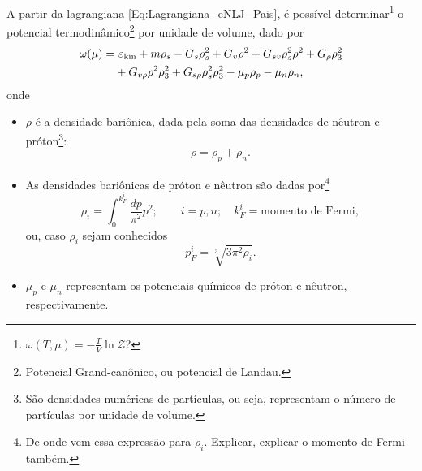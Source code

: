 A partir da lagrangiana \eqref{Eq:Lagrangiana_eNLJ_Pais}, é possível determinar\footnote{$\omega(T,\mu) = -\frac{T}{V} \ln \mathcal{Z}$?} o potencial termodinâmico\footnote{Potencial Grand-canônico, ou potencial de Landau.} por unidade de volume, dado por
\begin{equation}\label{Eq:potencial_termodinamico}
\begin{split}
	\omega(\mu) =&~ \varepsilon_{\rm{kin}} + m\rho_s - G_s\rho_s^2 + G_v\rho^2 + G_{sv}\rho_s^2\rho^2 + G_\rho\rho_3^2 \\
	&+ G_{v\rho}\rho^2\rho_3^2 + G_{s\rho}\rho_s^2\rho_3^2 - \mu_p\rho_p - \mu_n\rho_n,
\end{split}
\end{equation}
%
onde
\begin{itemize}
	\item $\rho$ é a densidade bariônica, dada pela soma das densidades de nêutron e próton\footnote{São densidades numéricas de partículas, ou seja, representam o número de partículas por unidade de volume.}:
	\begin{equation}
		\rho = \rho_p + \rho_n.
	\end{equation}

	\item As densidades bariônicas de próton e nêutron são dadas por\footnote{De onde vem essa expressão para $\rho_i$. Explicar, explicar o momento de Fermi também.}
	\begin{equation}
		\rho_i = \int_0^{k_F^i}\frac{dp}{\pi^2}p^2; \qquad i = p,n; \quad k_F^i = \textrm{momento de Fermi},
	\end{equation}
	ou, caso $\rho_i$ sejam conhecidos
	\begin{equation}\label{Eq:Mom_Fermi_a_partir_de_rho}
		p_F^i = \sqrt[3]{3\pi^2\rho_i}.
	\end{equation}
	
	\item $\mu_p$ e $\mu_n$ representam os potenciais químicos de próton e nêutron, respectivamente.
\end{itemize}


